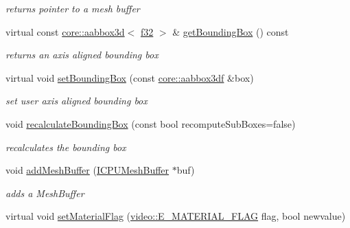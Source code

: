 \begin{DoxyCompactItemize}
\begin{DoxyCompactList}\small\item\em returns pointer to a mesh buffer \end{DoxyCompactList}\item 
virtual const \hyperlink{classirr_1_1core_1_1aabbox3d}{core\+::aabbox3d}$<$ \hyperlink{namespaceirr_a0277be98d67dc26ff93b1a6a1d086b07}{f32} $>$ \& \hyperlink{classirr_1_1scene_1_1SCPUMesh_adae935230822cf8fe704848e2ceea8be}{get\+Bounding\+Box} () const \hypertarget{classirr_1_1scene_1_1SCPUMesh_adae935230822cf8fe704848e2ceea8be}{}\label{classirr_1_1scene_1_1SCPUMesh_adae935230822cf8fe704848e2ceea8be}

\begin{DoxyCompactList}\small\item\em returns an axis aligned bounding box \end{DoxyCompactList}\item 
virtual void \hyperlink{classirr_1_1scene_1_1SCPUMesh_aaa92ceeaa9abff9b55d9316e01678d7e}{set\+Bounding\+Box} (const \hyperlink{namespaceirr_1_1core_adfc8fa01b30044c55f3332a1d6c1aa19}{core\+::aabbox3df} \&box)\hypertarget{classirr_1_1scene_1_1SCPUMesh_aaa92ceeaa9abff9b55d9316e01678d7e}{}\label{classirr_1_1scene_1_1SCPUMesh_aaa92ceeaa9abff9b55d9316e01678d7e}

\begin{DoxyCompactList}\small\item\em set user axis aligned bounding box \end{DoxyCompactList}\item 
void \hyperlink{classirr_1_1scene_1_1SCPUMesh_afac121927f337de151dddcd9f677e833}{recalculate\+Bounding\+Box} (const bool recompute\+Sub\+Boxes=false)\hypertarget{classirr_1_1scene_1_1SCPUMesh_afac121927f337de151dddcd9f677e833}{}\label{classirr_1_1scene_1_1SCPUMesh_afac121927f337de151dddcd9f677e833}

\begin{DoxyCompactList}\small\item\em recalculates the bounding box \end{DoxyCompactList}\item 
void \hyperlink{classirr_1_1scene_1_1SCPUMesh_a44ff7f5dfe8f32037638b11801db6ae2}{add\+Mesh\+Buffer} (\hyperlink{classirr_1_1scene_1_1ICPUMeshBuffer}{I\+C\+P\+U\+Mesh\+Buffer} $\ast$buf)
\begin{DoxyCompactList}\small\item\em adds a Mesh\+Buffer \end{DoxyCompactList}\item 
virtual void \hyperlink{classirr_1_1scene_1_1SCPUMesh_a3f151b1292b1e0aa70cde8f50793d85c}{set\+Material\+Flag} (\hyperlink{namespaceirr_1_1video_a8a3bc00ae8137535b9fbc5f40add70d3}{video\+::\+E\+\_\+\+M\+A\+T\+E\+R\+I\+A\+L\+\_\+\+F\+L\+AG} flag, bool newvalue)\hypertarget{classirr_1_1scene_1_1SCPUMesh_a3f151b1292b1e0aa70cde8f50793d85c}{}\label{classirr_1_1scene_1_1SCPUMesh_a3f151b1292b1e0aa70cde8f50793d85c}


\end{DoxyCompactItemize}
